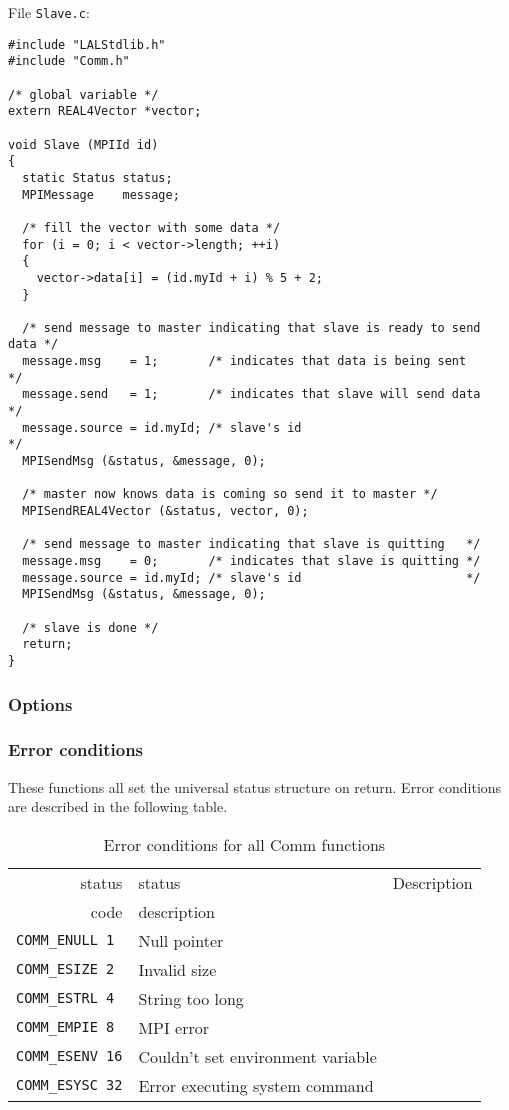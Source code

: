 \documentclass{article}
\begin{document}
File \verb+Slave.c+:
\begin{verbatim}
#include "LALStdlib.h"
#include "Comm.h"

/* global variable */
extern REAL4Vector *vector;

void Slave (MPIId id)
{
  static Status status;
  MPIMessage    message;

  /* fill the vector with some data */
  for (i = 0; i < vector->length; ++i)
  {
    vector->data[i] = (id.myId + i) % 5 + 2;
  }

  /* send message to master indicating that slave is ready to send data */
  message.msg    = 1;       /* indicates that data is being sent        */
  message.send   = 1;       /* indicates that slave will send data      */
  message.source = id.myId; /* slave's id                               */
  MPISendMsg (&status, &message, 0);

  /* master now knows data is coming so send it to master */
  MPISendREAL4Vector (&status, vector, 0);

  /* send message to master indicating that slave is quitting   */
  message.msg    = 0;       /* indicates that slave is quitting */
  message.source = id.myId; /* slave's id                       */
  MPISendMsg (&status, &message, 0);

  /* slave is done */
  return;
}
\end{verbatim}

\subsubsection{Options}

\subsubsection{Error conditions}

These functions all set the universal status structure on return.
Error conditions are described in the following table.

\begin{table}
\begin{tabular}{|r|l|p{2in}|}\hline
status  & status          & Description\\
code    & description     & \\\hline
\verb+COMM_ENULL 1 + & Null pointer & \\
\verb+COMM_ESIZE 2 + & Invalid size & \\
\verb+COMM_ESTRL 4 + & String too long & \\
\verb+COMM_EMPIE 8 + & MPI error & \\
\verb+COMM_ESENV 16+ & Couldn't set environment variable & \\
\verb+COMM_ESYSC 32+ & Error executing system command & \\
\hline
\end{tabular}
\caption{Error conditions for all Comm functions}\label{tbl:CV}
\end{table}
\end{document}
